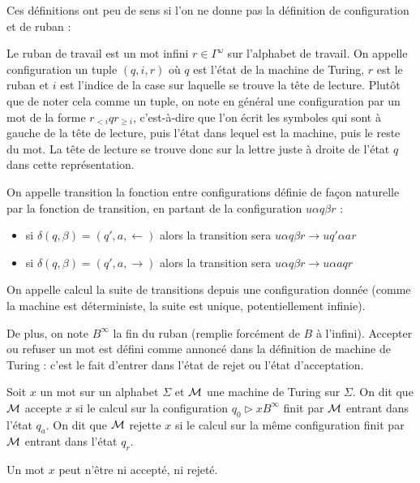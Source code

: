 Ces définitions ont peu de sens si l'on ne donne pas la définition de configuration et de ruban :

\begin{defi}
    Le ruban de travail est un mot infini $r\in \Gamma^\omega$ sur l'alphabet de travail. On appelle configuration un tuple $(q,i,r)$ où $q$ est l'état de la machine de Turing, $r$ est le ruban et $i$ est l'indice de la case sur laquelle se trouve la tête de lecture. Plutôt que de noter cela comme un tuple, on note en général une configuration par un mot de la forme $r_{<i}qr_{\geq i}$, c'est-à-dire que l'on écrit les symboles qui sont à gauche de la tête de lecture, puis l'état dans lequel est la machine, puis le reste du mot. La tête de lecture se trouve donc sur la lettre juste à droite de l'état $q$ dans cette représentation.

    On appelle transition la fonction entre configurations définie de façon naturelle par la fonction de transition, en partant de la configuration $u\alpha q\beta r$ :
    \begin{itemize}[label=$\bullet$]
        \item si $\delta(q,\beta) = (q',a,\leftarrow)$ alors la transition sera $u\alpha q\beta r \to uq'\alpha a r$
        \item si $\delta(q,\beta) = (q',a,\rightarrow)$ alors la transition sera $u\alpha q\beta r \to u\alpha a q r$
    \end{itemize}

    On appelle calcul la suite de transitions depuis une configuration donnée (comme la machine est déterministe, la suite est unique, potentiellement infinie).
\end{defi}

De plus, on note $B^\infty$ la fin du ruban (remplie forcément de $B$ à l'infini). Accepter ou refuser un mot est défini comme annoncé dans la définition de machine de Turing : c'est le fait d'entrer dans l'état de rejet ou l'état d'acceptation.

\begin{defi}
    Soit $x$ un mot sur un alphabet $\Sigma$ et $\mathcal M$ une machine de Turing sur $\Sigma$. On dit que $\mathcal M$ accepte $x$ si le calcul sur la configuration $q_0\rhd x B^\infty$ finit par $\mathcal M$ entrant dans l'état $q_a$. On dit que $\mathcal M$ rejette $x$ si le calcul sur la même configuration finit par $\mathcal M$ entrant dans l'état $q_r$.
\end{defi}

\begin{rmk}
    Un mot $x$ peut n'être ni accepté, ni rejeté.
\end{rmk}

